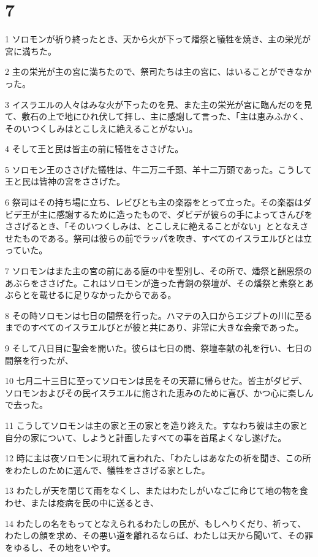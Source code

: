 \chapter{7}

\par 1 ソロモンが祈り終ったとき、天から火が下って燔祭と犠牲を焼き、主の栄光が宮に満ちた。
\par 2 主の栄光が主の宮に満ちたので、祭司たちは主の宮に、はいることができなかった。
\par 3 イスラエルの人々はみな火が下ったのを見、また主の栄光が宮に臨んだのを見て、敷石の上で地にひれ伏して拝し、主に感謝して言った、「主は恵みふかく、そのいつくしみはとこしえに絶えることがない」。
\par 4 そして王と民は皆主の前に犠牲をささげた。
\par 5 ソロモン王のささげた犠牲は、牛二万二千頭、羊十二万頭であった。こうして王と民は皆神の宮をささげた。
\par 6 祭司はその持ち場に立ち、レビびとも主の楽器をとって立った。その楽器はダビデ王が主に感謝するために造ったもので、ダビデが彼らの手によってさんびをささげるとき、「そのいつくしみは、とこしえに絶えることがない」ととなえさせたものである。祭司は彼らの前でラッパを吹き、すべてのイスラエルびとは立っていた。
\par 7 ソロモンはまた主の宮の前にある庭の中を聖別し、その所で、燔祭と酬恩祭のあぶらをささげた。これはソロモンが造った青銅の祭壇が、その燔祭と素祭とあぶらとを載せるに足りなかったからである。
\par 8 その時ソロモンは七日の間祭を行った。ハマテの入口からエジプトの川に至るまでのすべてのイスラエルびとが彼と共にあり、非常に大きな会衆であった。
\par 9 そして八日目に聖会を開いた。彼らは七日の間、祭壇奉献の礼を行い、七日の間祭を行ったが、
\par 10 七月二十三日に至ってソロモンは民をその天幕に帰らせた。皆主がダビデ、ソロモンおよびその民イスラエルに施された恵みのために喜び、かつ心に楽しんで去った。
\par 11 こうしてソロモンは主の家と王の家とを造り終えた。すなわち彼は主の家と自分の家について、しようと計画したすべての事を首尾よくなし遂げた。
\par 12 時に主は夜ソロモンに現れて言われた、「わたしはあなたの祈を聞き、この所をわたしのために選んで、犠牲をささげる家とした。
\par 13 わたしが天を閉じて雨をなくし、またはわたしがいなごに命じて地の物を食わせ、または疫病を民の中に送るとき、
\par 14 わたしの名をもってとなえられるわたしの民が、もしへりくだり、祈って、わたしの顔を求め、その悪い道を離れるならば、わたしは天から聞いて、その罪をゆるし、その地をいやす。
